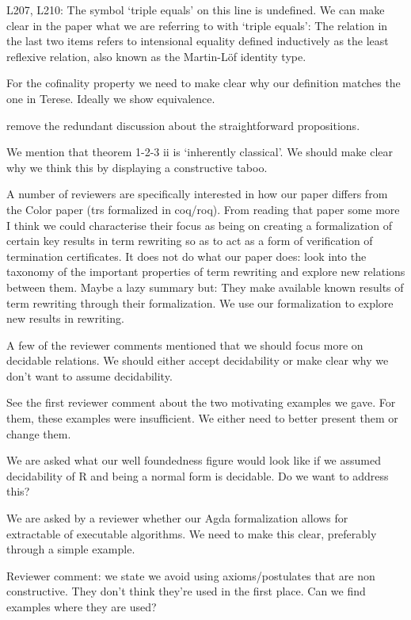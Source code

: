 \documentclass{article}
\newcommand{\cmark}{\ding{51}}%
\newcommand{\done}{\rlap{$\square$}{\raisebox{2pt}{\large\hspace{1pt}\cmark}}%
\hspace{-2.5pt}}
\begin{document}
\begin{todolist}
    \item * L207, L210: The symbol `triple equals' on this line is undefined. We can make clear in the paper what we are referring to with `triple equals': The relation  in the
    last two items refers to intensional equality defined inductively as the least reflexive relation, also known as the Martin-Löf identity type.
    \item For the cofinality property we need to make clear why our definition matches the one in Terese. Ideally we show equivalence. 
    \item [\done] remove the redundant discussion about the straightforward propositions.
    \item We mention that theorem 1-2-3 ii is `inherently classical'. We should make clear why we think this by displaying a constructive taboo.
    \item A number of reviewers are specifically interested in how our paper differs from the Color paper (trs formalized in coq/roq). From reading that paper some more I think we could characterise their focus as being on creating a formalization of certain key results in term rewriting so as to act as a form of verification of termination certificates. It does not do what our paper does: look into the taxonomy of the important properties of term rewriting and explore new relations between them. Maybe a lazy summary but: They make available known results of term rewriting through their formalization. We use our formalization to explore new results in rewriting. 
    \item A few of the reviewer comments mentioned that we should focus more on decidable relations. We should either accept decidability or make clear why we don't want to assume decidability.
    \item See the first reviewer comment about the two motivating examples we gave. For them, these examples were insufficient. We either need to better present them or change them.
    \item We are asked what our well foundedness figure would look like if we assumed decidability of R and being a normal form is decidable. Do we want to address this?
    \item We are asked by a reviewer whether our Agda formalization allows for extractable of executable algorithms. We need to make this clear, preferably through a simple example.
    \item Reviewer comment: we state we avoid using axioms/postulates that are non constructive. They don't think they're used in the first place. Can we find examples where they are used?

\end{todolist}
\end{document}
